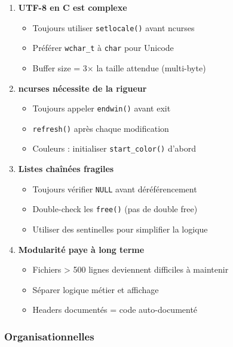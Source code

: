 \documentclass[12pt,a4paper]{article}
\begin{document}
\begin{enumerate}
    \item \textbf{UTF-8 en C est complexe}
    \begin{itemize}
        \item Toujours utiliser \texttt{setlocale()} avant ncurses
        \item Préférer \texttt{wchar\_t} à \texttt{char} pour Unicode
        \item Buffer size = 3× la taille attendue (multi-byte)
    \end{itemize}

    \item \textbf{ncurses nécessite de la rigueur}
    \begin{itemize}
        \item Toujours appeler \texttt{endwin()} avant exit
        \item \texttt{refresh()} après chaque modification
        \item Couleurs : initialiser \texttt{start\_color()} d'abord
    \end{itemize}

    \item \textbf{Listes chaînées fragiles}
    \begin{itemize}
        \item Toujours vérifier \texttt{NULL} avant déréférencement
        \item Double-check les \texttt{free()} (pas de double free)
        \item Utiliser des sentinelles pour simplifier la logique
    \end{itemize}

    \item \textbf{Modularité paye à long terme}
    \begin{itemize}
        \item Fichiers > 500 lignes deviennent difficiles à maintenir
        \item Séparer logique métier et affichage
        \item Headers documentés = code auto-documenté
    \end{itemize}
\end{enumerate}

\subsubsection{Organisationnelles}
\end{document}
